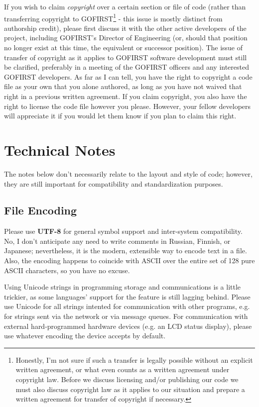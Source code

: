 \documentclass[12pt]{article}
\newcommand{\textdef}[1]{\textbf{#1}}
\begin{document}
If you wish to claim \emph{copyright} over a certain section or file of code (rather than transferring copyright to GOFIRST\footnote{Honestly, I'm not sure if such a transfer is legally possible without an explicit written agreement, or what even counts as a written agreement under copyright law. Before we discuss licensing and/or publishing our code we must also discuss copyright law as it applies to our situation and prepare a written agreement for transfer of copyright if necessary.}
- this issue is mostly distinct from authorship credit), please first discuss it with the other active developers of the project, including GOFIRST's Director of Engineering (or, should that position no longer exist at this time, the equivalent or successor position). The issue of transfer of copyright as it applies to GOFIRST software development must still be clarified, preferably in a meeting of the GOFIRST officers and any interested GOFIRST developers. As far as I can tell, you have the right to copyright a code file as your own that you alone authored, as long as you have not waived that right in a previous written agreement. If you claim copyright, you also have the right to license the code file however you please. However, your fellow developers will appreciate it if you would let them know if you plan to claim this right.

\section{Technical Notes}
The notes below don't necessarily relate to the layout and style of code; however, they are still important for compatibility and standardization purposes.
\subsection{File Encoding}
Please use \textdef{UTF-8} for general symbol support and inter-system compatibility. No, I don't anticipate any need to write comments in Russian, Finnish, or Japanese; nevertheless, it is the modern, extensible way to encode text in a file. Also, the encoding happens to coincide with ASCII over the entire set of 128 pure ASCII characters, so you have no excuse.

Using Unicode strings in programming storage and communications is a little trickier, as some languages' support for the feature is still lagging behind. Please use Unicode for all strings intented for communication with other programs, e.g. for strings sent via the network or via message queues. For communication with external hard-programmed hardware devices (e.g. an LCD status display), please use whatever encoding the device accepts by default.
\end{document}
